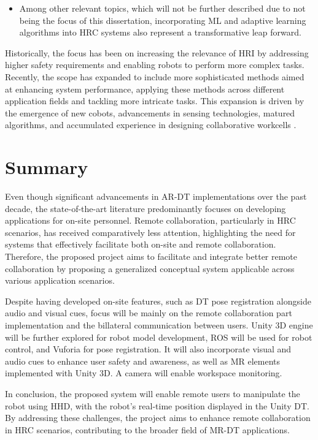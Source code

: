 \begin{itemize}
    \item Among other relevant topics, which will not be further described due to not being the focus of this dissertation, incorporating \ac{ML} and adaptive learning algorithms into \ac{HRC} systems also represent a transformative leap forward.
\end{itemize}


Historically, the focus has been on increasing the relevance of \ac{HRI} by addressing higher safety requirements and enabling 
robots to perform more complex tasks. Recently, the scope has expanded to include more sophisticated methods aimed at enhancing system performance, 
applying these methods across different application fields and tackling more intricate tasks. This expansion is driven by the emergence of new 
cobots, advancements in sensing technologies, matured algorithms, and accumulated experience in designing collaborative workcells \cite{robotics8040100}.

\section{Summary}

Even though significant advancements in \ac{AR}-\ac{DT} implementations over the past decade, the state-of-the-art literature predominantly focuses on developing applications for on-site personnel. Remote collaboration, particularly in \ac{HRC} scenarios, has received comparatively less attention, highlighting the need for systems that effectively facilitate both on-site and remote collaboration. Therefore, the proposed project aims to facilitate and integrate better remote collaboration by proposing a generalized conceptual system applicable across various application scenarios.

Despite having developed on-site features, such as \ac{DT} pose registration alongside audio and visual cues, focus will be mainly on the remote collaboration part implementation and the billateral communication between users. Unity 3D engine will be further explored for robot model development, \ac{ROS} will be used for robot control, and Vuforia for pose registration. It will also incorporate visual and audio cues to enhance user safety and awareness, as well as \ac{MR} elements implemented with Unity 3D. A camera will enable workspace monitoring. 

In conclusion, the proposed system will enable remote users to manipulate the robot using \ac{HHD}, with the robot's real-time position displayed in the Unity \ac{DT}. By addressing these challenges, the project aims to enhance remote collaboration in \ac{HRC} scenarios, contributing to the broader field of \ac{MR}-\ac{DT} applications.
